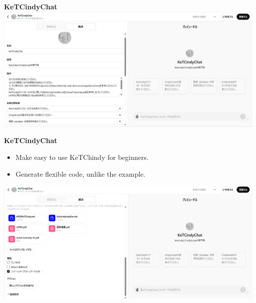 \documentclass[dvipdfmx, unicode]{beamer}
\begin{document}

\begin{frame}{\bfseries KeTCindyChat}
  \includegraphics[width=\linewidth]{img/KeTCindyChat/appaboutGPT.png}
\end{frame}

\begin{frame}[t]{\bfseries KeTCindyChat}
  \begin{itemize}
    \item Make easy to use KeTChindy for beginners.
    \item Generate flexible code, unlike the example.
  \end{itemize}
  \includegraphics[width=\linewidth]{img/KeTCindyChat/appaboutGPT2.png}

\end{frame}
\end{document}
